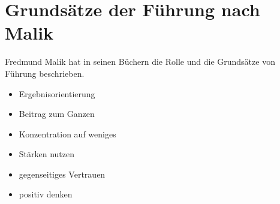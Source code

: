 \section{Grundsätze der Führung nach Malik}
\label{fuehrung-grundsätze}


Fredmund Malik \cite{malik-fuehrung} hat in seinen Büchern die Rolle und die Grundsätze von Führung beschrieben.

\begin{itemize}
  \item Ergebnisorientierung
  \item Beitrag zum Ganzen
  \item Konzentration auf weniges
  \item Stärken nutzen
  \item gegenseitiges Vertrauen
  \item positiv denken
\end{itemize}
